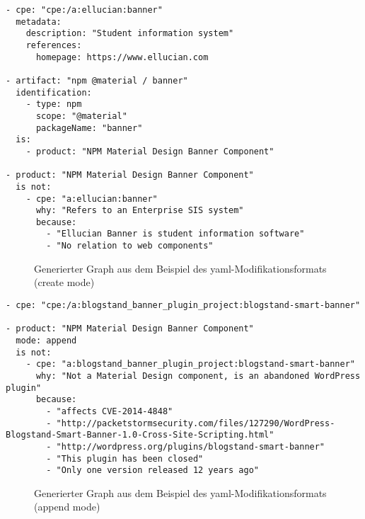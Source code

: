 \begin{lstlisting}[style=yaml,caption={Beispiel des \acrshort{yaml}-Modifikationsformats (create mode)},label={lst:modell-graph-modification-yaml-demo},basicstyle=\ttfamily\scriptsize]
- cpe: "cpe:/a:ellucian:banner"
  metadata:
    description: "Student information system"
    references:
      homepage: https://www.ellucian.com

- artifact: "npm @material / banner"
  identification:
    - type: npm
      scope: "@material"
      packageName: "banner"
  is:
    - product: "NPM Material Design Banner Component"

- product: "NPM Material Design Banner Component"
  is not:
    - cpe: "a:ellucian:banner"
      why: "Refers to an Enterprise SIS system"
      because:
        - "Ellucian Banner is student information software"
        - "No relation to web components"
\end{lstlisting}

\begin{figure}[htbp]
    \centering
    \makebox[\textwidth]{}
    \caption{Generierter Graph aus dem Beispiel des \acrshort{yaml}-Modifikationsformats (create mode)}
    \label{fig:modell-graph-modification-yaml-demo-rendered}
\end{figure}

\begin{lstlisting}[style=yaml,caption={Beispiel des \acrshort{yaml}-Modifikationsformats (append mode)},label={lst:modell-graph-modification-yaml-demo-append},basicstyle=\ttfamily\scriptsize]
- cpe: "cpe:/a:blogstand_banner_plugin_project:blogstand-smart-banner"

- product: "NPM Material Design Banner Component"
  mode: append
  is not:
    - cpe: "a:blogstand_banner_plugin_project:blogstand-smart-banner"
      why: "Not a Material Design component, is an abandoned WordPress plugin"
      because:
        - "affects CVE-2014-4848"
        - "http://packetstormsecurity.com/files/127290/WordPress-Blogstand-Smart-Banner-1.0-Cross-Site-Scripting.html"
        - "http://wordpress.org/plugins/blogstand-smart-banner"
        - "This plugin has been closed"
        - "Only one version released 12 years ago"
\end{lstlisting}

\begin{figure}[htbp]
    \centering
    \makebox[\textwidth]{}
    \caption{Generierter Graph aus dem Beispiel des \acrshort{yaml}-Modifikationsformats (append mode)}
    \label{fig:modell-graph-modification-yaml-demo-append-rendered}
\end{figure}

